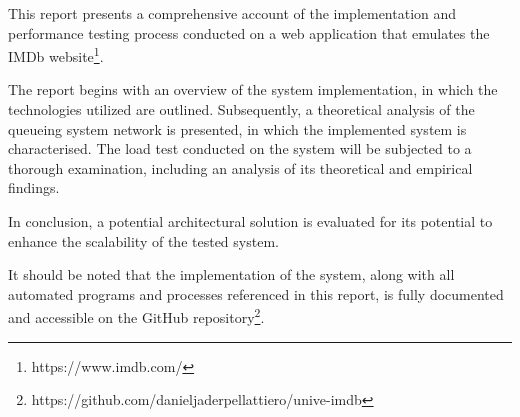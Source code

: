 This report presents a comprehensive account of the implementation and performance testing process conducted on a web application that emulates the IMDb website\footnote[1]{https://www.imdb.com/}.

The report begins with an overview of the system implementation, in which the technologies utilized are outlined. Subsequently, a theoretical analysis of the queueing system network is presented, in which the implemented system is characterised.
The load test conducted on the system will be subjected to a thorough examination, including an analysis of its theoretical and empirical findings.

In conclusion, a potential architectural solution is evaluated for its potential to enhance the scalability of the tested system.

It should be noted that the implementation of the system, along with all automated programs and processes referenced in this report, is fully documented and accessible on the GitHub repository\footnote[2]{https://github.com/danieljaderpellattiero/unive-imdb}.
